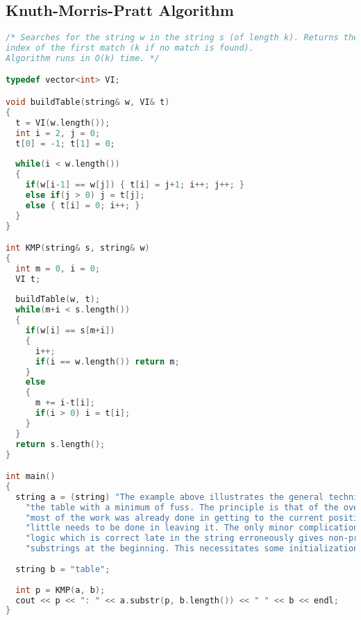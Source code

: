 \subsection{Knuth-Morris-Pratt Algorithm}
\begin{lstlisting}[language=C++]
/* Searches for the string w in the string s (of length k). Returns the 0-based
index of the first match (k if no match is found).
Algorithm runs in O(k) time. */

typedef vector<int> VI;

void buildTable(string& w, VI& t)
{
  t = VI(w.length());  
  int i = 2, j = 0;
  t[0] = -1; t[1] = 0;
  
  while(i < w.length())
  {
    if(w[i-1] == w[j]) { t[i] = j+1; i++; j++; }
    else if(j > 0) j = t[j];
    else { t[i] = 0; i++; }
  }
}

int KMP(string& s, string& w)
{
  int m = 0, i = 0;
  VI t;
  
  buildTable(w, t);  
  while(m+i < s.length())
  {
    if(w[i] == s[m+i])
    {
      i++;
      if(i == w.length()) return m;
    }
    else
    {
      m += i-t[i];
      if(i > 0) i = t[i];
    }
  }  
  return s.length();
}

int main()
{
  string a = (string) "The example above illustrates the general technique for assembling "+
    "the table with a minimum of fuss. The principle is that of the overall search: "+
    "most of the work was already done in getting to the current position, so very "+
    "little needs to be done in leaving it. The only minor complication is that the "+
    "logic which is correct late in the string erroneously gives non-proper "+
    "substrings at the beginning. This necessitates some initialization code.";
  
  string b = "table";
  
  int p = KMP(a, b);
  cout << p << ": " << a.substr(p, b.length()) << " " << b << endl;
}

\end{lstlisting}